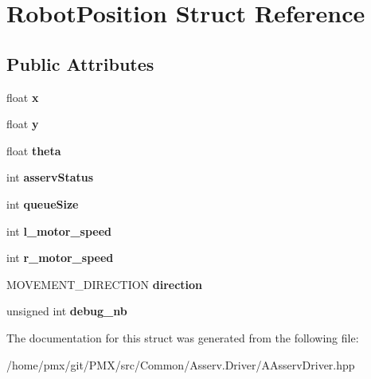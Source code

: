 \hypertarget{structRobotPosition}{}\section{Robot\+Position Struct Reference}
\label{structRobotPosition}
\subsection*{Public Attributes}
\begin{DoxyCompactItemize}
\item 
\mbox{\label{structRobotPosition_a23815e48c79cea6781057f665804b101}} 
float {\bfseries x}
\item 
\mbox{\label{structRobotPosition_a0eb198d5322d97845f8da2ac94930cbc}} 
float {\bfseries y}
\item 
\mbox{\label{structRobotPosition_a0a226a9f6bc73b9ec38b70854b0ef95d}} 
float {\bfseries theta}
\item 
\mbox{\label{structRobotPosition_a721850aeb58cecf0b71b7f78e8f9d634}} 
int {\bfseries asserv\+Status}
\item 
\mbox{\label{structRobotPosition_ae9a5b86588ffc81294de7c1770866bd1}} 
int {\bfseries queue\+Size}
\item 
\mbox{\label{structRobotPosition_af4d0a164269cc26b04c8bc5068869ec3}} 
int {\bfseries l\+\_\+motor\+\_\+speed}
\item 
\mbox{\label{structRobotPosition_a8f6d211e26e8c5899c922a075a48c9af}} 
int {\bfseries r\+\_\+motor\+\_\+speed}
\item 
\mbox{\label{structRobotPosition_a43c027fee527cdb12648aae2c00fe7e9}} 
M\+O\+V\+E\+M\+E\+N\+T\+\_\+\+D\+I\+R\+E\+C\+T\+I\+ON {\bfseries direction}
\item 
\mbox{\label{structRobotPosition_ab7c9fbf4b74a8c15c07f01e83cbd5c58}} 
unsigned int {\bfseries debug\+\_\+nb}
\end{DoxyCompactItemize}


The documentation for this struct was generated from the following file\+:\begin{DoxyCompactItemize}
\item 
/home/pmx/git/\+P\+M\+X/src/\+Common/\+Asserv.\+Driver/A\+Asserv\+Driver.\+hpp\end{DoxyCompactItemize}
